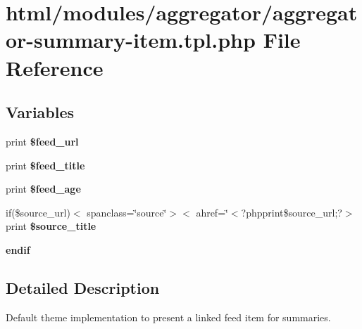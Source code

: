 \hypertarget{aggregator-summary-item_8tpl_8php}{
\section{html/modules/aggregator/aggregator-\/summary-\/item.tpl.php File Reference}
\label{aggregator-summary-item_8tpl_8php}
}
\subsection*{Variables}
\begin{DoxyCompactItemize}
\item 
\hypertarget{aggregator-summary-item_8tpl_8php_aa9dadc8b078c51d64c9c67fe879f12c7}{
print {\bfseries \$feed\_\-url}}
\label{aggregator-summary-item_8tpl_8php_aa9dadc8b078c51d64c9c67fe879f12c7}

\item 
\hypertarget{aggregator-summary-item_8tpl_8php_a6edb4dc2cf77c7c787f39d946791c26a}{
print {\bfseries \$feed\_\-title}}
\label{aggregator-summary-item_8tpl_8php_a6edb4dc2cf77c7c787f39d946791c26a}

\item 
\hypertarget{aggregator-summary-item_8tpl_8php_a70ad511a3fda1a5fffb44bc8d82c4dde}{
print {\bfseries \$feed\_\-age}}
\label{aggregator-summary-item_8tpl_8php_a70ad511a3fda1a5fffb44bc8d82c4dde}

\item 
\hypertarget{aggregator-summary-item_8tpl_8php_a388fc7503e7d8eacef3d2a432ffd0687}{
if(\$source\_\-url)$<$ spanclass=\char`\"{}source\char`\"{}$>$$<$ ahref=\char`\"{}$<$?phpprint\$source\_\-url;?$>$ print {\bfseries \$source\_\-title}}
\label{aggregator-summary-item_8tpl_8php_a388fc7503e7d8eacef3d2a432ffd0687}

\item 
\hypertarget{aggregator-summary-item_8tpl_8php_a82cd33ca97ff99f2fcc5e9c81d65251b}{
{\bfseries endif}}
\label{aggregator-summary-item_8tpl_8php_a82cd33ca97ff99f2fcc5e9c81d65251b}

\end{DoxyCompactItemize}


\subsection{Detailed Description}
Default theme implementation to present a linked feed item for summaries.

